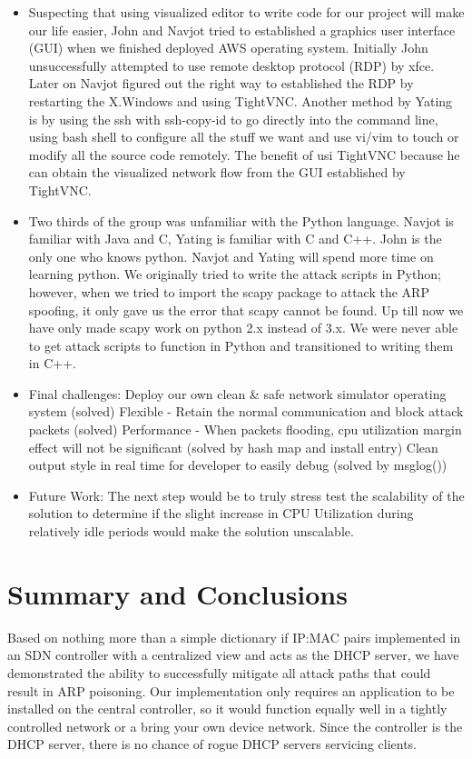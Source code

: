 \documentclass[conference]{IEEEtran}
\begin{document}
\begin{itemize}
\item Suspecting that using visualized editor to write code for our project will make our life easier, John and Navjot tried to established a graphics user interface (GUI) when we finished deployed AWS operating system. Initially John unsuccessfully attempted  to use remote desktop protocol (RDP) by xfce. Later on Navjot figured out the right way to established the RDP by restarting the X.Windows and using TightVNC. Another method by Yating is by using the ssh with ssh-copy-id to go directly into the command line, using bash shell to configure all the stuff we want and use vi/vim to touch or modify all the source code remotely. The benefit of usi TightVNC because he can obtain the visualized network flow from the GUI established by TightVNC.

\item Two thirds of the group was unfamiliar with the Python language. Navjot is familiar with Java and C, Yating is familiar with C and C++. John is the only one who knows python. Navjot and Yating will spend more time on learning python. We originally tried to write the attack scripts in Python; however, when we tried to import the scapy package to attack the ARP spoofing, it only gave us the error that scapy cannot be found. Up till now we have only made scapy work on python 2.x instead of 3.x. We were never able to get attack scripts to function in Python and transitioned to writing them in C++.

\item Final challenges: 
Deploy our own clean \& safe network simulator operating system (solved)
Flexible - Retain the normal communication and block attack packets (solved)
Performance - When packets flooding, cpu utilization margin effect will not be significant (solved by hash map and install entry)
Clean output style in real time for developer to easily debug (solved by msglog())

\item Future Work:
The next step would be to truly stress test the scalability of the solution to determine if the slight increase in CPU Utilization during relatively idle periods would make the solution unscalable.
\end{itemize}

\section{Summary and Conclusions}
Based on nothing more than a simple dictionary if IP:MAC pairs implemented in an SDN controller with a centralized view and acts as the DHCP server, we have demonstrated the ability to successfully mitigate all attack paths that could result in ARP poisoning. Our implementation only requires an application to be installed on the central controller, so it would function equally well in a tightly controlled network or a bring your own device network. Since the controller is the DHCP server, there is no chance of rogue DHCP servers servicing clients.
\end{document}
